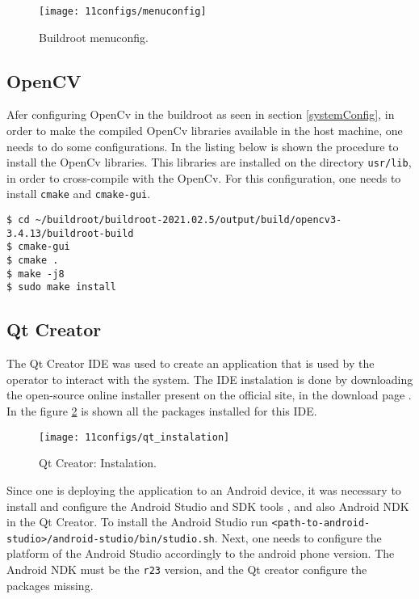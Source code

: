 \begin{figure}[H]
	\centering	
	\texttt{[image: 11configs/menuconfig]}
	\caption{Buildroot menuconfig.}
	\label{fig:menuconfig}
\end{figure}

\subsection{OpenCV}

Afer configuring OpenCv in the buildroot as seen in section \ref{systemConfig}, in order to make the compiled OpenCv libraries available in the host machine, one needs to do some configurations. In the listing below is shown the procedure to install the OpenCv libraries. This libraries are installed on the directory \verb|usr/lib|, in order to cross-compile with the OpenCv. For this configuration, one needs to install \verb|cmake| and \verb|cmake-gui|.

\begin{lstlisting}
$ cd ~/buildroot/buildroot-2021.02.5/output/build/opencv3-3.4.13/buildroot-build
$ cmake-gui
$ cmake .
$ make -j8
$ sudo make install
\end{lstlisting}

\subsection{Qt Creator}

The Qt Creator IDE was used to create an application that is used by the operator to interact with the system. The IDE instalation is done by downloading the open-source online installer present on the official site, in the download page \cite{qt_creator}. In the figure \ref{fig:qt_instalation} is shown all the packages installed for this IDE.

\begin{figure}[H]
	\centering	
	\texttt{[image: 11configs/qt\_instalation]}
	\caption{Qt Creator: Instalation.}
	\label{fig:qt_instalation}
\end{figure}

Since one is deploying the application to an Android device, it was necessary to install and configure the Android Studio and SDK tools \cite{android_studio}, and also Android NDK \cite{android_ndk} in the Qt Creator. To install the Android Studio run \verb|<path-to-android-studio>/android-studio/bin/studio.sh|. Next, one needs to configure the platform of the Android Studio accordingly to the android phone version. The Android NDK must be the \verb|r23| version, and the Qt creator configure the packages missing.

